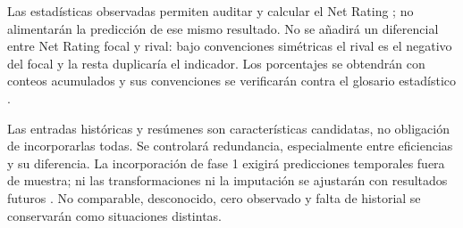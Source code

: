 Las estadísticas observadas permiten auditar y calcular el Net Rating \cite{nbaGlosarioFase2}; no alimentarán la predicción de ese mismo resultado. No se añadirá un diferencial entre Net Rating focal y rival: bajo convenciones simétricas el rival es el negativo del focal y la resta duplicaría el indicador. Los porcentajes se obtendrán con conteos acumulados y sus convenciones se verificarán contra el glosario estadístico \cite{basketballReferenceGameScore}.

Las entradas históricas y resúmenes son características candidatas, no obligación de incorporarlas todas. Se controlará redundancia, especialmente entre eficiencias y su diferencia. La incorporación de fase 1 exigirá predicciones temporales fuera de muestra; ni las transformaciones ni la imputación se ajustarán con resultados futuros \cite{sklearnCommonPitfallsPonderacion}. No comparable, desconocido, cero observado y falta de historial se conservarán como situaciones distintas.
